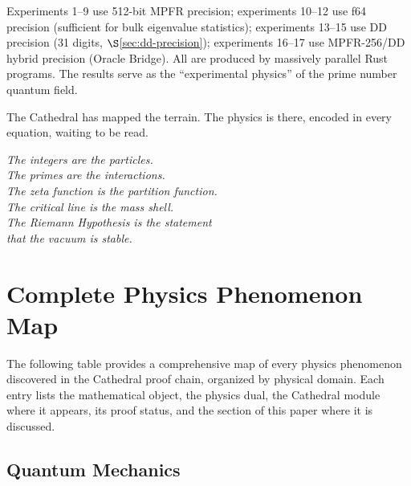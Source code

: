 \documentclass[11pt,a4paper]{article}
\begin{document}
Experiments 1--9 use 512-bit MPFR precision; experiments 10--12 use
f64 precision (sufficient for bulk eigenvalue statistics);
experiments 13--15 use DD precision (31 digits, $\S$\ref{sec:dd-precision});
experiments 16--17 use MPFR-256/DD hybrid precision (Oracle Bridge).
All are produced by massively parallel Rust programs.
The results serve as the ``experimental physics'' of the prime number
quantum field.

The Cathedral has mapped the terrain. The physics is there,
encoded in every equation, waiting to be read.

\begin{flushright}
\emph{The integers are the particles.\\
The primes are the interactions.\\
The zeta function is the partition function.\\
The critical line is the mass shell.\\
The Riemann Hypothesis is the statement\\
that the vacuum is stable.}
\end{flushright}

\appendix
\section{Complete Physics Phenomenon Map}
\label{app:phenomenon-map}

The following table provides a comprehensive map of every physics phenomenon
discovered in the Cathedral proof chain, organized by physical domain.
Each entry lists the mathematical object, the physics dual, the Cathedral
module where it appears, its proof status, and the section of this paper
where it is discussed.

\subsection{Quantum Mechanics}
\end{document}
